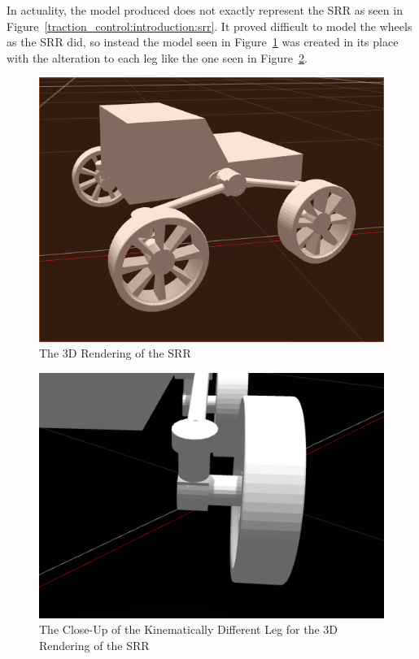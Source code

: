 In actuality, the model produced does not exactly represent the \ac{SRR} as seen in Figure~\ref{traction_control:introduction:srr}. It proved difficult to model the wheels as the \ac{SRR} did, so instead the model seen in Figure~\ref{traction_control:discussion:srr-gazebo} was created in its place with the alteration to each leg like the one seen in Figure~\ref{traction_control:discussion:srr-gazebo-link}.

\begin{figure}[H]
	\centering
	\includegraphics[width=.8\textwidth]{sections/discussion/images/srr_gazebo.png}
	\caption{The 3D Rendering of the \acl{SRR}}
	\label{traction_control:discussion:srr-gazebo}
\end{figure}

\begin{figure}[H]
	\centering
	\includegraphics[width=.8\textwidth]{sections/discussion/images/srr_gazebo_link.png}
	\caption{The Close-Up of the Kinematically Different Leg for the 3D Rendering of the \acl{SRR}}
	\label{traction_control:discussion:srr-gazebo-link}
\end{figure}

